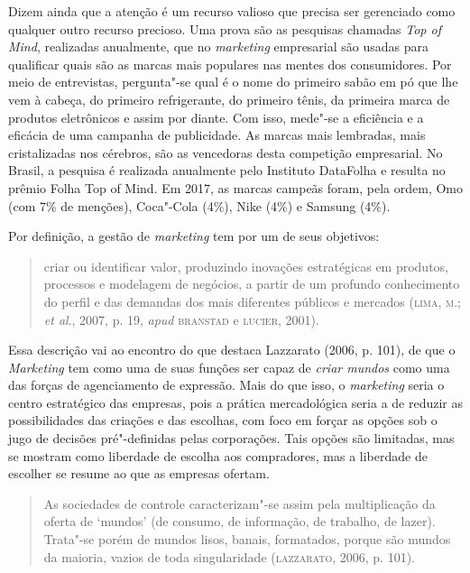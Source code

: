 Dizem ainda que a atenção é um recurso valioso que precisa ser
gerenciado como qualquer outro recurso precioso. Uma prova são as
pesquisas chamadas \emph{Top of Mind}, realizadas anualmente, que no
\emph{marketing} empresarial são usadas para qualificar quais são as
marcas mais populares nas mentes dos consumidores. Por meio de
entrevistas, pergunta"-se qual é o nome do primeiro sabão em pó que lhe
vem à cabeça, do primeiro refrigerante, do primeiro tênis, da primeira
marca de produtos eletrônicos e assim por diante. Com isso, mede"-se a
eficiência e a eficácia de uma campanha de publicidade. As marcas mais
lembradas, mais cristalizadas nos cérebros, são as vencedoras desta
competição empresarial. No Brasil, a pesquisa é realizada anualmente
pelo Instituto DataFolha e resulta no prêmio Folha Top of Mind. Em 2017,
as marcas campeãs foram, pela ordem, Omo (com 7\% de menções), Coca"-Cola
(4\%), Nike (4\%) e Samsung (4\%).

Por definição, a gestão de \emph{marketing} tem por um de seus
objetivos:

\begin{quote}
criar ou identificar valor, produzindo inovações estratégicas em
produtos, processos e modelagem de negócios, a partir de um profundo
conhecimento do perfil e das demandas dos mais diferentes públicos e
mercados (\textsc{lima, m}.; \emph{et al}., 2007, p. 19, \emph{apud} \textsc{branstad} e \textsc{lucier}, 2001).
\end{quote}

Essa descrição vai ao encontro do que destaca Lazzarato (2006, p. 101),
de que o \emph{Marketing} tem como uma de suas funções ser capaz de
\emph{criar mundos} como uma das forças de agenciamento de expressão.
Mais do que isso, o \emph{marketing} seria o centro estratégico das
empresas, pois a prática mercadológica seria a de reduzir as
possibilidades das criações e das escolhas, com foco em forçar as opções
sob o jugo de decisões pré"-definidas pelas corporações. Tais opções são
limitadas, mas se mostram como liberdade de escolha aos compradores, mas
a liberdade de escolher se resume ao que as empresas ofertam.

\begin{quote}
As sociedades de controle caracterizam"-se assim pela multiplicação da
oferta de `mundos' (de consumo, de informação, de trabalho, de lazer).
Trata"-se porém de mundos lisos, banais, formatados, porque são mundos da
maioria, vazios de toda singularidade (\textsc{lazzarato}, 2006, p. 101).
\end{quote}

